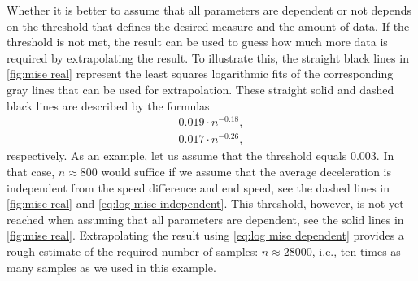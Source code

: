 Whether it is better to assume that all parameters are dependent or not depends on the threshold that defines the desired measure and the amount of data. If the threshold is not met, the result can be used to guess how much more data is required by extrapolating the result. To illustrate this, the straight black lines in \cref{fig:mise real} represent the least squares logarithmic fits of the corresponding gray lines that can be used for extrapolation. These straight solid and dashed black lines are described by the formulas
\begin{align}
	0.019 \cdot n^{-0.18}, \label{eq:log mise dependent} \\
	0.017 \cdot n^{-0.26}, \label{eq:log mise independent}
\end{align}
respectively. As an example, let us assume that the threshold equals $0.003$. In that case, $n \approx 800$ would suffice if we assume that the average deceleration is independent from the speed difference and end speed, see the dashed lines in \cref{fig:mise real} and \cref{eq:log mise independent}. This threshold, however, is not yet reached when assuming that all parameters are dependent, see the solid lines in \cref{fig:mise real}. Extrapolating the result using \cref{eq:log mise dependent} provides a rough estimate of the required number of samples: $n \approx 28000$, i.e., ten times as many samples as we used in this example.

